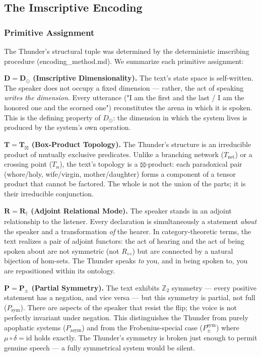 \documentclass[12pt,a4paper]{article}
\begin{document}
\subsection{The Imscriptive Encoding}

\subsubsection{Primitive Assignment}

The Thunder's structural tuple was determined by the deterministic imscribing procedure (encoding\_method.md). We summarize each primitive assignment:

\textbf{$\mathbf{D = D_{\odot}}$ (Imscriptive Dimensionality).} The text's state space is self-written. The speaker does not occupy a fixed dimension --- rather, the act of speaking \emph{writes the dimension}. Every utterance ("I am the first and the last / I am the honored one and the scorned one") reconstitutes the arena in which it is spoken. This is the defining property of $D_{\odot}$: the dimension in which the system lives is produced by the system's own operation.

\textbf{$\mathbf{T = T_{\boxtimes}}$ (Box-Product Topology).} The Thunder's structure is an irreducible product of mutually exclusive predicates. Unlike a branching network ($T_\text{net}$) or a crossing point ($T_{\bowtie}$), the text's topology is a $\boxtimes$-product: each paradoxical pair (whore/holy, wife/virgin, mother/daughter) forms a component of a tensor product that cannot be factored. The whole is not the union of the parts; it is their irreducible conjunction.

\textbf{$\mathbf{R = R_{\dagger}}$ (Adjoint Relational Mode).} The speaker stands in an adjoint relationship to the listener. Every declaration is simultaneously a statement \emph{about} the speaker and a transformation \emph{of} the hearer. In category-theoretic terms, the text realizes a pair of adjoint functors: the act of hearing and the act of being spoken about are not symmetric (not $R_{\leftrightarrow}$) but are connected by a natural bijection of hom-sets. The Thunder speaks \emph{to} you, and in being spoken to, you are repositioned within its ontology.

\textbf{$\mathbf{P = P_{\pm}}$ (Partial Symmetry).} The text exhibits $\mathbb{Z}_2$ symmetry --- every positive statement has a negation, and vice versa --- but this symmetry is partial, not full ($P_\text{sym}$). There are aspects of the speaker that resist the flip; the voice is not perfectly invariant under negation. This distinguishes the Thunder from purely apophatic systems ($P_\text{asym}$) and from the Frobenius-special case ($P_{\pm}^{\text{sym}}$) where $\mu \circ \delta = \text{id}$ holds exactly. The Thunder's symmetry is broken just enough to permit genuine speech --- a fully symmetrical system would be silent.
\end{document}
